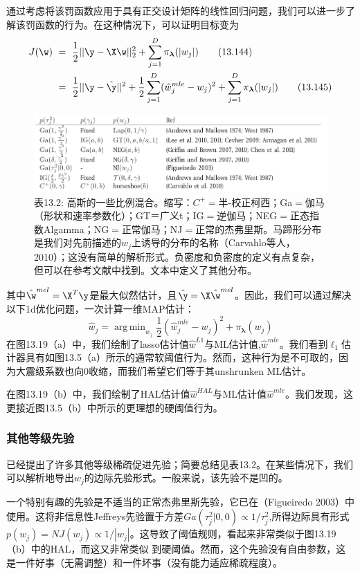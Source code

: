 \documentclass[a4paper]{article}
\DeclareMathOperator*{\argmin}{arg\,min}
\begin{document}
通过考虑将该罚函数应用于具有正交设计矩阵的线性回归问题，我们可以进一步了解该罚函数的行为。在这种情况下，可以证明目标变为
\begin{align}
	J(\w)\ &=\ \frac{1}{2}||\y-\X\w||_2^2+\sum_{j=1}^{D}\pi_{\boldsymbol{\lambda}}(|w_j|)\tag{13.144}\\
	&=\ \frac{1}{2}||\y-\hat{\y}||^2+\frac{1}{2}\sum_{j=1}^{D}(\hat{w}_j^{mle}-w_j)^2+\sum_{j=1}^{D}\pi_{\boldsymbol{\lambda}}(|w_j|)\tag{13.145}
\end{align}

\begin{figure}[h]
	\centering
	\includegraphics[width=0.7\linewidth]{fig13/table2}
	\caption*{表13.2: 高斯的一些比例混合。缩写：$C^+=$半-校正柯西；Ga$=$伽马（形状和速率参数化）；GT$＝$广义t；IG$=$逆伽马；NEG$=$正态指数Algamma；NG$=$正常伽马；NJ$=$正常的杰弗里斯。马蹄形分布是我们对先前描述的$w_j$上诱导的分布的名称（Carvahlo等人，2010）；这没有简单的解析形式。负密度和负密度的定义有点复杂，但可以在参考文献中找到。文本中定义了其他分布。}
\end{figure}

其中$\hat{\w}^{mel}=\X^T\y$是最大似然估计，且$\hat{\y}=\X\hat{\w}^{mel}$。因此，我们可以通过解决以下1d优化问题，一次计算一维MAP估计：
\begin{equation}
	\hat{w}_j=\argmin_{w_j}\frac{1}{2}(\hat{w}_j^{mle}-w_j)^2+\pi_{\boldsymbol{\lambda}}(w_j)\tag{13.146}
\end{equation}
在图13.19（a）中，我们绘制了lasso估计值$\hat{w}^{L1}$与ML估计值,$\hat{w}^{mle}$。我们看到$\ell_1$估计器具有如图13.5（a）所示的通常软阈值行为。然而，这种行为是不可取的，因为大震级系数也向0收缩，而我们希望它们等于其unshrunken ML估计。

在图13.19（b）中，我们绘制了HAL估计值$\hat{w}^{HAL}$与ML估计值$\hat{w}^{mle}$。我们发现，这更接近图13.5（b）中所示的更理想的硬阈值行为。

\subsubsection{其他等级先验}
已经提出了许多其他等级稀疏促进先验；简要总结见表13.2。在某些情况下，我们可以解析地导出$w_j$的边际先验形式。一般来说，该先验不是凹的。

一个特别有趣的先验是不适当的正常杰弗里斯先验，它已在（Figueiredo 2003）中使用。这将非信息性Jeffreys先验置于方差$Ga(\tau_j^2|0,0)\propto1/\tau_j^2$,所得边际具有形式$p(w_j)=NJ(w_j)\propto 1/|w_j|$。这导致了阈值规则，看起来非常类似于图13.19（b）中的HAL，而这又非常类似
到硬阈值。然而，这个先验没有自由参数，这是一件好事（无需调整）和一件坏事（没有能力适应稀疏程度）。
\end{document}
